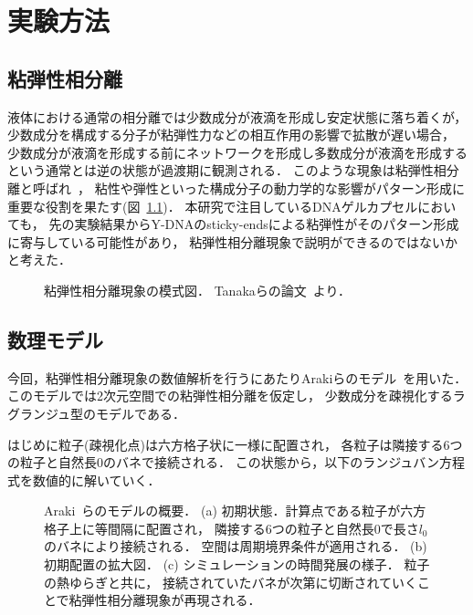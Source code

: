 \chapter{実験方法}

\section{粘弾性相分離}
液体における通常の相分離では少数成分が液滴を形成し安定状態に落ち着くが，
少数成分を構成する分子が粘弾性力などの相互作用の影響で拡散が遅い場合，
少数成分が液滴を形成する前にネットワークを形成し多数成分が液滴を形成するという通常とは逆の状態が過渡期に観測される．
このような現象は粘弾性相分離と呼ばれ~\cite{tanaka2009formation}，
粘性や弾性といった構成分子の動力学的な影響がパターン形成に重要な役割を果たす(図~\ref{fig:veps})．
本研究で注目しているDNAゲルカプセルにおいても，
先の実験結果からY-DNAのsticky-endsによる粘弾性がそのパターン形成に寄与している可能性があり，
粘弾性相分離現象で説明ができるのではないかと考えた．

\begin{figure}
\centering

\caption{
    粘弾性相分離現象の模式図．
    Tanakaらの論文~\cite{tanaka2009formation}より．
}

\label{fig:veps}
\end{figure}

\section{数理モデル}
今回，粘弾性相分離現象の数値解析を行うにあたりArakiらのモデル~\cite{araki2005simple}を用いた．
このモデルでは2次元空間での粘弾性相分離を仮定し，
少数成分を疎視化するラグランジュ型のモデルである．

はじめに粒子(疎視化点)は六方格子状に一様に配置され，
各粒子は隣接する6つの粒子と自然長$0$のバネで接続される．
この状態から，以下のランジュバン方程式を数値的に解いていく．


\begin{figure}
\centering

\caption{
    Araki~\cite{araki2005simple}らのモデルの概要．
    (a) 初期状態．計算点である粒子が六方格子上に等間隔に配置され，
        隣接する6つの粒子と自然長$0$で長さ$l_0$のバネにより接続される．
        空間は周期境界条件が適用される．
    (b) 初期配置の拡大図．
    (c) シミュレーションの時間発展の様子．
        粒子の熱ゆらぎと共に，
        接続されていたバネが次第に切断されていくことで粘弾性相分離現象が再現される．
}
\label{fig:model_2d}
\end{figure}


